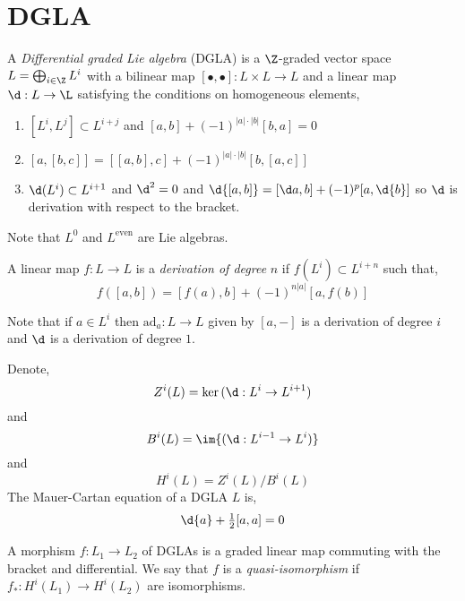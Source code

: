 \documentclass[12pt]{article}
\begin{document}
\section{DGLA}


\begin{defn}
A \textit{Differential graded Lie algebra} (DGLA) is a $\Z$-graded vector space $L = \bigoplus_{i \in \Z} L^i$ with a bilinear map $[\bullet, \bullet] : L \times L \to L$ and a linear map $\d : L \to \L$ satisfying the conditions on homogeneous elements,
\begin{enumerate}
\item $[L^i, L^j] \subset L^{i+j}$ and $[a,b] + (-1)^{|a|\cdot |b|}[b,a] = 0$
\item $[a,[b,c]] = [[a,b], c] + (-1)^{|a|\cdot|b|} [b, [a,c]]$
\item $\d(L^i) \subset L^{i+1}$ and $\d^2 = 0$ and $\d{[a,b]} = [\d a, b] + (-1)^p [a, \d{b}]$ so $\d$ is derivation with respect to the bracket.
\end{enumerate}
\end{defn}

\begin{rmk}
Note that $L^0$ and $L^{\text{even}}$ are Lie algebras.
\end{rmk}

\begin{defn}
A linear map $f : L \to L$ is a \textit{derivation of degree} $n$ if $f(L^i) \subset L^{i+n}$ such that,
\[ f([a,b]) = [f(a), b] + (-1)^{n |a|} [a, f(b)] \]
\end{defn}

\newcommand{\ad}{\mathrm{ad}}

\begin{rmk}
Note that if $a \in L^i$ then $\ad_a : L \to L$ given by $[a, -]$ is a derivation of degree $i$ and $\d$ is a derivation of degree $1$.
\end{rmk}

\begin{defn}
Denote,
\[ Z^i(L) = \ker{(\d : L^i \to L^{i+1})} \]
and
\[ B^i(L) = \im{(\d : L^{i-1} \to L^i)} \]
and
\[ H^i(L) = Z^i(L)/B^i(L) \]
The Mauer-Cartan equation of a DGLA $L$ is,
\[ \d{a} + \tfrac{1}{2} [a,a] = 0 \]
\end{defn}

\begin{defn}
A morphism $f : L_1 \to L_2$ of DGLAs is a graded linear map commuting with the bracket and differential. We say that $f$ is a \textit{quasi-isomorphism} if $f_* : H^i(L_1) \to H^i(L_2)$ are isomorphisms.
\end{defn}
\end{document}
